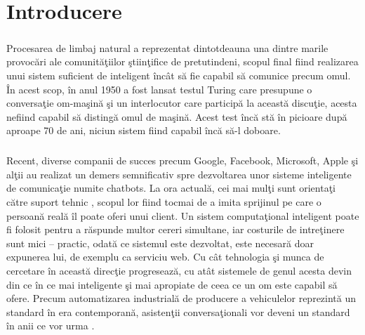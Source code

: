 \chapter{Introducere}

\paragraph{}
Procesarea de limbaj natural a reprezentat dintotdeauna una dintre marile provoc\u ari ale comunit\u a\c tiilor \c stiin\c tifice de pretutindeni, scopul final fiind realizarea unui sistem suficient de inteligent \^ inc\^ at s\u a fie capabil s\u a comunice precum omul. \^ In acest scop, \^ in anul 1950 a fost lansat testul Turing \cite{sep-turing-test} care presupune o conversa\c tie om-ma\c sin\u a \c si un interlocutor care particip\u a la aceast\u a discu\c tie, acesta nefiind capabil s\u a disting\u a omul de ma\c sin\u a. Acest test \^ inc\u a st\u a \^ in picioare dup\u a aproape 70 de ani, niciun sistem fiind capabil \^ inc\u a s\u a-l doboare. 

\paragraph{}
Recent, diverse companii de succes precum Google, Facebook, Microsoft, Apple \c si al\c tii au realizat un demers semnificativ spre dezvoltarea unor sisteme inteligente de comunica\c tie numite chatbots. La ora actual\u a, cei mai mul\c ti sunt orienta\c ti c\u atre suport tehnic \cite{support-chat-bots}, scopul lor fiind tocmai de a imita sprijinul pe care o persoan\u a real\u a \^ il poate oferi unui client. Un sistem computa\c tional inteligent poate fi folosit pentru a r\u aspunde multor cereri simultane, iar costurile de intre\c tinere sunt mici – practic, odat\u a ce sistemul este dezvoltat, este necesar\u a doar expunerea lui, de exemplu ca serviciu web. Cu c\^ at tehnologia \c si munca de cercetare \^ in aceast\u a direc\c tie progreseaz\u a, cu at\^ at sistemele de genul acesta devin din ce \^ in ce mai inteligente \c si mai apropiate de ceea ce un om este capabil s\u a ofere. Precum automatizarea industrial\u a de producere a vehiculelor reprezint\u a un standard \^ in era contemporan\u a, asisten\c tii conversa\c tionali vor deveni un standard \^ in anii ce vor urma \cite{business-chat-bots}.

